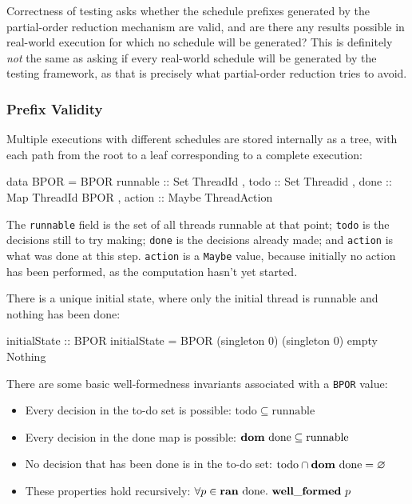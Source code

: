 Correctness of testing asks whether the schedule prefixes generated by
the partial-order reduction mechanism are valid, and are there any
results possible in real-world execution for which no schedule will be
generated? This is definitely \emph{not} the same as asking if every
real-world schedule will be generated by the testing framework, as
that is precisely what partial-order reduction tries to avoid.

\subsubsection{Prefix Validity}
\label{sec:correctness-testing-validity}

Multiple executions with different schedules are stored internally as
a tree, with each path from the root to a leaf corresponding to a
complete execution:

\begin{haskellcode}
data BPOR = BPOR
  { runnable :: Set ThreadId
  , todo     :: Set Threadid
  , done     :: Map ThreadId BPOR
  , action   :: Maybe ThreadAction
  }
\end{haskellcode}

The \verb|runnable| field is the set of all threads runnable at that
point; \verb|todo| is the decisions still to try making; \verb|done|
is the decisions already made; and \verb|action| is what was done at
this step. \verb|action| is a \verb|Maybe| value, because initially no
action has been performed, as the computation hasn't yet started.

There is a unique initial state, where only the initial thread is
runnable and nothing has been done:

\begin{haskellcode}
initialState :: BPOR
initialState = BPOR (singleton 0) (singleton 0) empty Nothing
\end{haskellcode}

There are some basic well-formedness invariants associated with a
\verb|BPOR| value:

\begin{itemize}
\item Every decision in the to-do set is possible:
  $\mathrm{todo} \subseteq \mathrm{runnable}$

\item Every decision in the done map is possible:
  $\mathbf{dom}~\mathrm{done} \subseteq \mathrm{runnable}$

\item No decision that has been done is in the to-do set:
  $\mathrm{todo} \cap \mathbf{dom}~\mathrm{done} = \varnothing$

\item These properties hold recursively:
  $\forall p \in \mathbf{ran}~\mathrm{done}.~\mathbf{well\_formed}~p$
\end{itemize}

